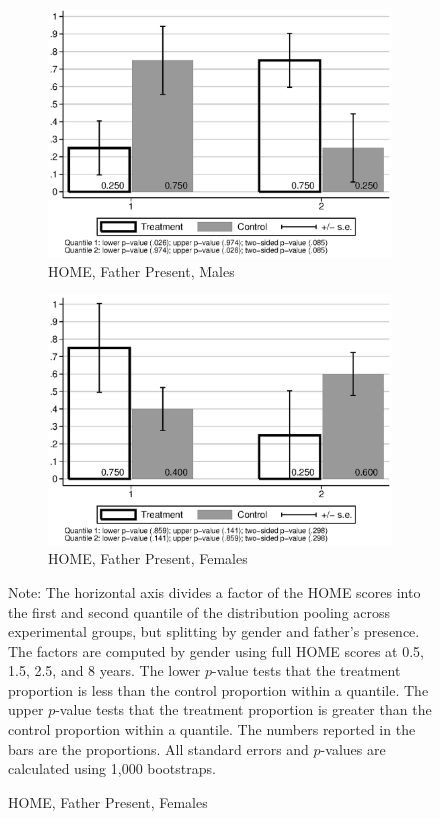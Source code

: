\begin{figure}
\begin{center}
	\begin{subfigure}[b]{0.49\textwidth}
		\centering
		\caption{HOME, Father Present, Males}
		\label{fig:home-male-factor}
			\includegraphics[width=\textwidth]{output/HOME-male1-fhome1-2quant}
	\end{subfigure}
	\begin{subfigure}[b]{0.49\textwidth}
		\centering
		\caption{HOME, Father Present, Females}
		\label{fig:home-female-factor}
			\includegraphics[width=\textwidth]{output/HOME-male0-fhome1-2quant}
	\end{subfigure}
\end{center}
\raggedright \footnotesize
Note: The horizontal axis divides a factor of the HOME scores into the first and second quantile of the distribution pooling across experimental groups, but splitting  by gender and father's presence. The factors are computed by gender using full HOME scores at 0.5, 1.5, 2.5, and 8 years. The lower $p$-value tests that the treatment proportion is less than the control proportion within a quantile. The upper $p$-value tests that the treatment proportion is greater than the control proportion within a quantile. The numbers reported in the bars are the proportions. All standard errors and $p$-values are calculated using 1,000 bootstraps.
\end{figure}

